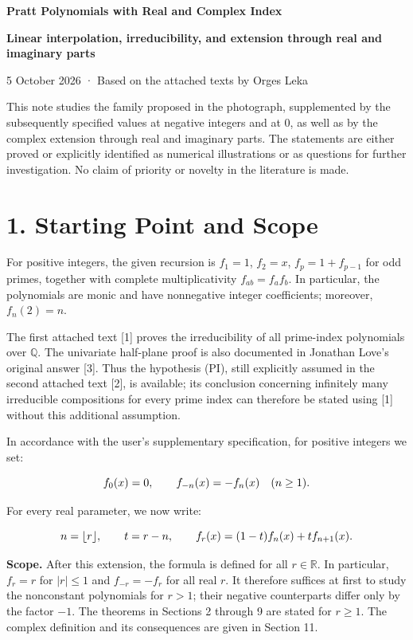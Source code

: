 \documentclass[11pt,a4paper]{article}
\newcommand{\fitmath}[1]{\begingroup\setbox0=\hbox{$\displaystyle #1$}\ifdim\wd0>\linewidth\resizebox{\linewidth}{!}{\box0}\else\box0\fi\endgroup}
\begin{document}
{\LARGE\bfseries Pratt Polynomials with Real and Complex Index\par}\bigskip

\textbf{Linear interpolation, irreducibility, and extension through real and imaginary parts}


5 October 2026 · Based on the attached texts by Orges Leka


This note studies the family proposed in the photograph, supplemented by the subsequently specified values at negative integers and at 0, as well as by the complex extension through real and imaginary parts. The statements are either proved or explicitly identified as numerical illustrations or as questions for further investigation. No claim of priority or novelty in the literature is made.


\section*{1. Starting Point and Scope}

For positive integers, the given recursion is $f_1=1$, $f_2=x$, $f_p=1+f_{p-1}$ for odd primes, together with complete multiplicativity $f_{ab}=f_af_b$. In particular, the polynomials are monic and have nonnegative integer coefficients; moreover, $f_n(2)=n$.


The first attached text [1] proves the irreducibility of all prime-index polynomials over $\mathbb Q$. The univariate half-plane proof is also documented in Jonathan Love's original answer [3]. Thus the hypothesis (PI), still explicitly assumed in the second attached text [2], is available; its conclusion concerning infinitely many irreducible compositions for every prime index can therefore be stated using [1] without this additional assumption.


In accordance with the user's supplementary specification, for positive integers we set:


\[
\fitmath{f_0(x)=0,\qquad f_{-n}(x)=-f_n(x)\quad(n\geq1).}
\]


For every real parameter, we now write:


\[
\fitmath{n=\lfloor r\rfloor,\qquad t=r-n,\qquad f_r(x)=(1-t)f_n(x)+t f_{n+1}(x).}
\]


\textbf{Scope.} After this extension, the formula is defined for all $r\in\mathbb R$. In particular, $f_r=r$ for $|r|\leq1$ and $f_{-r}=-f_r$ for all real $r$. It therefore suffices at first to study the nonconstant polynomials for $r>1$; their negative counterparts differ only by the factor $-1$. The theorems in Sections 2 through 9 are stated for $r\geq1$. The complex definition and its consequences are given in Section 11.
\end{document}

